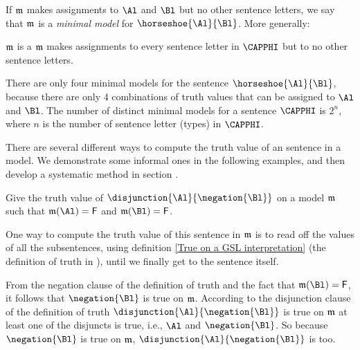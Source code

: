 If $\mathfrak{m}$ makes assignments to $\Al$ and $\Bl$ but no other sentence letters, we say that $\mathfrak{m}$ is a \emph{minimal model} for $\horseshoe{\Al}{\Bl}$. More generally:

\begin{majorILnc}{}
	$\mathfrak{m}$ is a  \Iff $\mathfrak{m}$ makes assignments to every sentence letter in $\CAPPHI$ but to no other sentence letters.
\end{majorILnc}

\noindent{}There are only four minimal models for the sentence $\horseshoe{\Al}{\Bl}$, because there are only $4$ combinations of truth values that can be assigned to $\Al$ and $\Bl$. The number of distinct minimal models for a sentence $\CAPPHI$ is $2^n$, where $n$ is the number of sentence letter (types) in $\CAPPHI$.

There are several different ways to compute the truth value of an \GSL{} sentence in a model.
We demonstrate some informal ones in the following examples, and then develop a systematic method in section . 

\begin{majorILnc}{}
	Give the truth value of $\disjunction{\Al}{\negation{\Bl}}$ on a model $\mathfrak{m}$ such that $\IntA(\Al)=\FalseB$ and $\IntA(\Bl)=\FalseB$.
	
	One way to compute the truth value of this sentence in $\mathfrak{m}$ is to read off the values of all the subsentences, using definition \ref{True on a GSL interpretation} (the definition of truth in \GSL{}), until we finally get to the sentence itself.
	
	\begin{PROOF}	
		From the negation clause of the definition of truth and the fact that $\IntA(\Bl)=\FalseB$, it follows that $\negation{\Bl}$ is true on $\mathfrak{m}$. According to the disjunction clause of the definition of truth $\disjunction{\Al}{\negation{\Bl}}$ is true on $\mathfrak{m}$ \Iff at least one of the disjuncts is true, i.e., $\Al$ and $\negation{\Bl}$. So because $\negation{\Bl}$ is true on $\mathfrak{m}$, $\disjunction{\Al}{\negation{\Bl}}$ is too.
	\end{PROOF}

\end{majorILnc}

